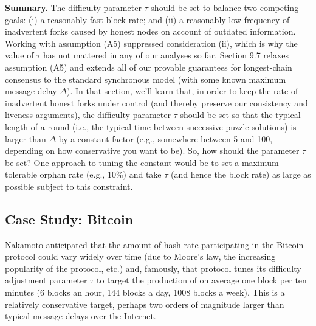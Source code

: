 \noindent
\textbf{Summary.} The difficulty parameter $\tau$ should be set to balance two competing goals: (i)
a reasonably fast block rate; and (ii) a reasonably low frequency of inadvertent forks caused
by honest nodes on account of outdated information.
Working with assumption (A5) suppressed consideration (ii), which is why the value of $\tau$
has not mattered in any of our analyses so far. Section 9.7 relaxes assumption (A5) and extends
all of our provable guarantees for longest-chain consensus to the standard synchronous model
(with some known maximum message delay $\Delta$). In that section, we’ll learn that, in order to
keep the rate of inadvertent honest forks under control (and thereby preserve our consistency
and liveness arguments), the difficulty parameter $\tau$ should be set so that the typical length
of a round (i.e., the typical time between successive puzzle solutions) is larger than $\Delta$ by
a constant factor (e.g., somewhere between 5 and 100, depending on how conservative you
want to be). So, how should the parameter $\tau$ be set?
One approach to tuning the constant would be to set a maximum tolerable orphan rate (e.g.,
10\%) and take $\tau$ (and hence the block rate) as large as possible subject to this constraint.
\subsection{Case Study: Bitcoin}
Nakamoto anticipated that the amount of hash rate participating in the Bitcoin protocol
could vary widely over time (due to Moore’s law, the increasing popularity of the protocol,
etc.) and, famously, that protocol tunes its difficulty adjustment parameter $\tau$ to target the
production of on average one block per ten minutes (6 blocks an hour, 144 blocks a day, 1008
blocks a week). This is a relatively conservative target, perhaps two orders of magnitude
larger than typical message delays over the Internet.\\

